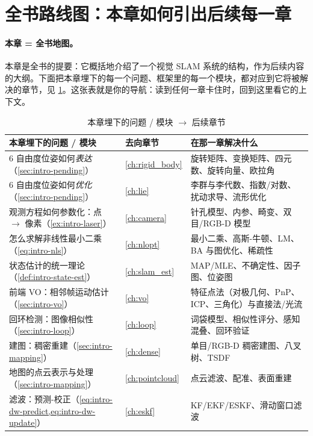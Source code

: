 \section{全书路线图：本章如何引出后续每一章}
\label{sec:intro-roadmap}

\paragraph{本章 = 全书地图。}
本章是全书的提要：它概括地介绍了一个视觉 SLAM 系统的结构，作为后续内容的大纲\cite{gaoxiang2019slam14}。下面把本章埋下的每一个问题、框架里的每一个模块，都对应到它将被解决的章节，见 \cref{tab:intro-roadmap}。这张表就是你的导航：读到任何一章卡住时，回到这里看它的上下文。

\begin{table}[H]\centering\small
\caption{本章埋下的问题 / 模块 $\to$ 后续章节}
\label{tab:intro-roadmap}
\begin{tabular}{p{} p{} p{}}
\toprule
本章埋下的问题 / 模块 & 去向章节 & 在那一章解决什么 \\
\midrule
6 自由度位姿如何\emph{表达}（\cref{sec:intro-pending}） & \cref{ch:rigid_body} & 旋转矩阵、变换矩阵、四元数、旋转向量、欧拉角 \\
6 自由度位姿如何\emph{优化}（\cref{sec:intro-pending}） & \cref{ch:lie} & 李群与李代数、指数/对数、扰动求导、流形优化 \\
观测方程如何参数化：点 $\to$ 像素（\cref{ex:intro-laser}） & \cref{ch:camera} & 针孔模型、内参、畸变、双目/RGB-D 模型 \\
怎么求解非线性最小二乘（\cref{eq:intro-nls}） & \cref{ch:nlopt} & 最小二乘、高斯-牛顿、LM、BA 与图优化、稀疏性 \\
状态估计的统一理论（\cref{def:intro-state-est}） & \cref{ch:slam_est} & MAP/MLE、不确定性、因子图、位姿图 \\
前端 VO：相邻帧运动估计（\cref{sec:intro-vo}） & \cref{ch:vo} & 特征点法（对极几何、PnP、ICP、三角化）与直接法/光流 \\
回环检测：图像相似性（\cref{sec:intro-loop}） & \cref{ch:loop} & 词袋模型、相似性评分、感知混叠、回环验证 \\
建图：稠密重建（\cref{sec:intro-mapping}） & \cref{ch:dense} & 单目/RGB-D 稠密建图、八叉树、TSDF \\
地图的点云表示与处理（\cref{sec:intro-mapping}） & \cref{ch:pointcloud} & 点云滤波、配准、表面重建 \\
滤波：预测-校正（\cref{eq:intro-dw-predict,eq:intro-dw-update}） & \cref{ch:eskf} & KF/EKF/ESKF、滑动窗口滤波 \\

\end{tabular}
\end{table}
